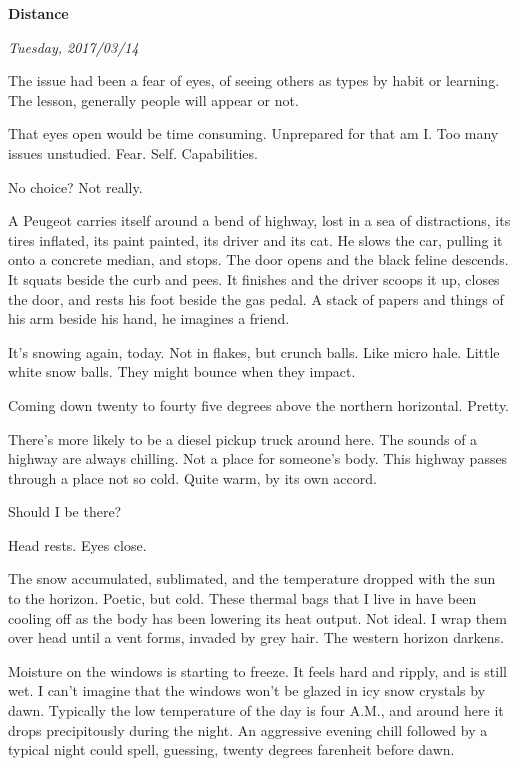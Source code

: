 

\centerline{\bf Distance}
\centerline{\it Tuesday, 2017/03/14}



\vfill
\break

﻿The issue had been a fear of eyes, of seeing others as types by habit
or learning.  The lesson, generally people will appear or not.

That eyes open would be time consuming.  Unprepared for that am I.
Too many issues unstudied.  Fear.  Self.  Capabilities.

No choice?  Not really.

\vfill
\break

﻿A Peugeot carries itself around a bend of highway, lost in a sea of
distractions, its tires inflated, its paint painted, its driver and
its cat.  He slows the car, pulling it onto a concrete median, and
stops.  The door opens and the black feline descends.  It squats
beside the curb and pees.  It finishes and the driver scoops it up,
closes the door, and rests his foot beside the gas pedal.  A stack of
papers and things of his arm beside his hand, he imagines a friend.

\vfill
\break

﻿It's snowing again, today.  Not in flakes, but crunch balls.  Like
micro hale.  Little white snow balls.  They might bounce when they
impact.

Coming down twenty to fourty five degrees above the northern
horizontal.  Pretty.

There's more likely to be a diesel pickup truck around here.  The
sounds of a highway are always chilling.  Not a place for someone's
body.  This highway passes through a place not so cold.  Quite warm,
by its own accord.

\vfill
\break

﻿Should I be there?

Head rests.  Eyes close.

\vfill
\break

﻿The snow accumulated, sublimated, and the temperature dropped with the
sun to the horizon.  Poetic, but cold.  These thermal bags that I live
in have been cooling off as the body has been lowering its heat
output.  Not ideal.  I wrap them over head until a vent forms, invaded
by grey hair.  The western horizon darkens.

\vfill
\break

﻿Moisture on the windows is starting to freeze.  It feels hard and
ripply, and is still wet.  I can't imagine that the windows won't be
glazed in icy snow crystals by dawn.  Typically the low temperature of
the day is four A.M., and around here it drops precipitously during
the night.  An aggressive evening chill followed by a typical night
could spell, guessing, twenty degrees farenheit before dawn.

